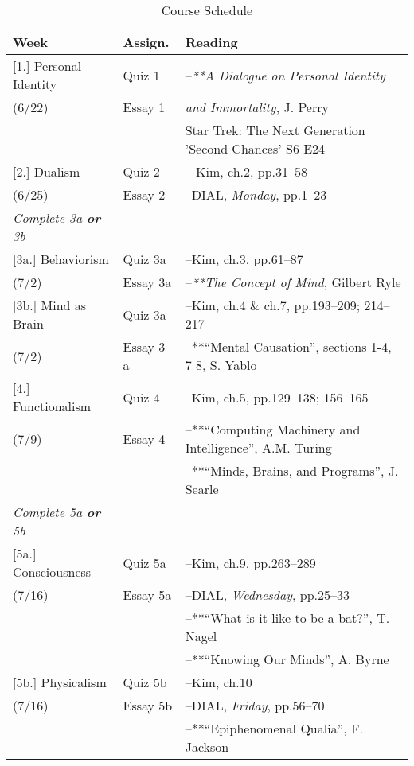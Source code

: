 \documentclass[article,oneside]{memoir}
\begin{document}
\begin{center}
\begin{longtable}{p{4.5cm}p{1.5cm}p{6.5cm}}
 
  \caption{Course Schedule} \\
  \toprule
  \textbf{Week} &\textbf{Assign.} & \textbf{Reading} \\
  \midrule

[1.] Personal Identity			& Quiz 1		& --\emph{**A Dialogue on Personal Identity } \\
(6/22)				        		& Essay 1		& \emph{and Immortality}, J. Perry  \\ 
						&			& Star Trek: The Next Generation 'Second Chances' S6 E24 \\ [.5\baselineskip] \midrule
	
[2.] Dualism			      	& Quiz 2		& -- Kim, ch.2, pp.31--58\\
(6/25)					 & Essay 2		& --DIAL, \emph{Monday}, pp.1--23  \\   
 [1\baselineskip] \midrule

\emph{Complete 3a \textbf{or} 3b}	& 		& 	\\ [.5\baselineskip]

[3a.] Behaviorism		    	& Quiz 3a	   	& --Kim, ch.3, pp.61--87 \\
(7/2)			        			& Essay 3a	&  --\emph{**The Concept of Mind}, Gilbert Ryle\\  [.5\baselineskip]
  
[3b.] Mind as Brain 		   	& Quiz 3a	   	& --Kim, ch.4 \& ch.7, pp.193--209; 214--217\\
(7/2)					         & Essay 3	a	& --**``Mental Causation'', sections 1-4, 7-8, S. Yablo  \\  [1\baselineskip]   \midrule



[4.] Functionalism			& Quiz 4		& --Kim, ch.5, pp.129--138; 156--165\\
(7/9)		            			& Essay 4		& --**``Computing Machinery and Intelligence'', A.M. Turing  \\  
						&			& --**``Minds, Brains, and Programs'', J.  Searle \\ [1\baselineskip] \midrule
		
\emph{Complete 5a \textbf{or} 5b}	& 		& 	\\ [.5\baselineskip]

		
[5a.] Consciousness 		& Quiz 5a		& --Kim, ch.9, pp.263--289 \\
(7/16)				      	& Essay 5a		& --DIAL, \emph{Wednesday}, pp.25--33 \\
						& 			& --**``What is it like to be a bat?'', T. Nagel \\ 
						&			& --**``Knowing Our Minds'', A. Byrne \\ [.5\baselineskip] 
 
[5b.] Physicalism		& Quiz 5b		& --Kim, ch.10 \\ 
(7/16)				      	& Essay 5b		& --DIAL, \emph{Friday}, pp.56--70 \\ 
					      	&			& --**``Epiphenomenal Qualia'', F. Jackson \\ 
\end{longtable}
\end{center}
\end{document}
